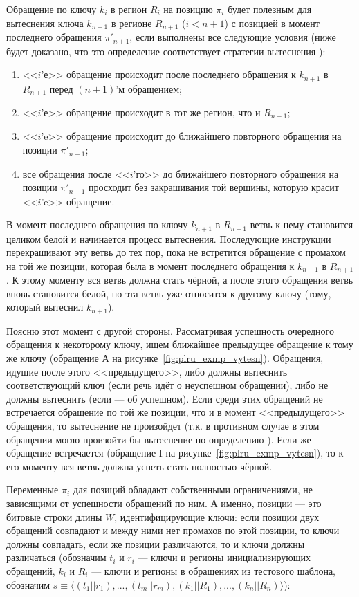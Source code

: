 Обращение по ключу $k_i$ в регион $R_i$ на позицию $\pi_i$ будет полезным для вытеснения ключа $k_{n+1}$ в регионе $R_{n+1}$ ($i < n+1$) с позицией в момент последнего обращения $\pi'_{n+1}$, если выполнены все следующие условия (ниже будет доказано, что это определение соответствует стратегии вытеснения \PseudoLRU):
\begin{enumerate}
  \item <<$i$'е>> обращение происходит после последнего обращения к $k_{n+1}$ в $R_{n+1}$ перед $(n+1)$'м обращением;
  \item <<$i$'е>> обращение происходит в тот же регион, что и $R_{n+1}$;
  \item <<$i$'e>> обращение происходит до ближайшего повторного обращения на позиции $\pi'_{n+1}$;
  \item все обращения после <<$i$'го>> до ближайшего повторного обращения на позиции $\pi'_{n+1}$ просходит без закрашивания той вершины, которую красит <<$i$'e>> обращение.
\end{enumerate}

В момент последнего обращения по ключу $k_{n+1}$ в $R_{n+1}$ ветвь к нему становится целиком белой и начинается процесс вытеснения. Последующие инструкции перекрашивают эту ветвь до тех пор, пока не встретится обращение с промахом на той же позиции, которая была в момент последнего обращения к $k_{n+1}$ в $R_{n+1}$. К этому моменту вся ветвь должна стать чёрной, а после этого обращения ветвь вновь становится белой, но эта ветвь уже относится к другому ключу (тому, который вытеснил $k_{n+1}$).

Поясню этот момент с другой стороны. Рассматривая успешность очередного обращения к некоторому ключу, ищем ближайшее предыдущее обращение к тому же ключу (обращение А на рисунке~\ref{fig:plru_exmp_vytesn}). Обращения, идущие после этого <<предыдущего>>, либо должны вытеснить соответствующий ключ (если речь идёт о неуспешном обращении), либо не должны вытеснить (если --- об успешном). Если среди этих обращений не встречается обращение по той же позиции, что и в момент <<предыдущего>> обращения, то вытеснение не произойдет (т.к. в противном случае в этом обращении могло произойти бы вытеснение по определению \PseudoLRU). Если же обращение встречается (обращение I на рисунке~\ref{fig:plru_exmp_vytesn}), то к его моменту вся ветвь должна успеть стать полностью чёрной.

Переменные $\pi_i$ для позиций обладают собственными ограничениями, не зависящими от успешности обращений по ним. А именно, позиции --- это битовые строки длины $W$, идентифицирующие ключи: если позиции двух обращений совпадают и между ними нет промахов по этой позиции, то ключи должны совпадать, если же позиции различаются, то и ключи должны различаться (обозначим $t_i$ и $r_i$ --- ключи и регионы инициализирующих обращений, $k_i$ и $R_i$ --- ключи и регионы в обращениях из тестового шаблона, обозначим $s \equiv \langle (t_1||r_1), ..., (t_m||r_m), (k_1||R_1), ..., (k_n||R_n)\rangle$):

